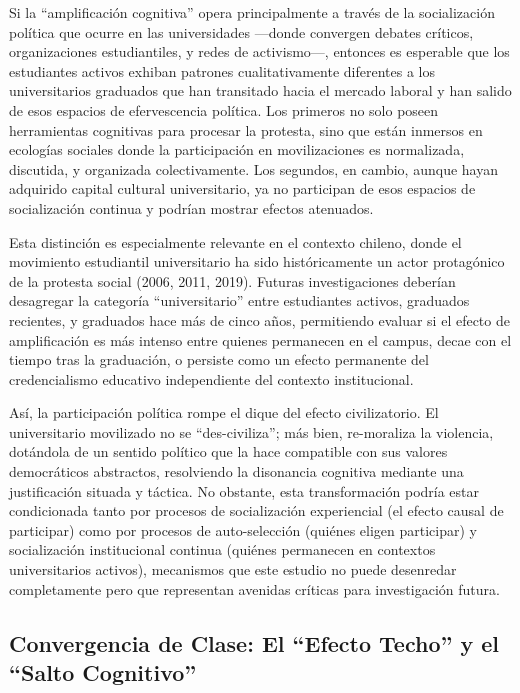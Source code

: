 \documentclass[
  13pt,
]{article}
\begin{document}
Si la ``amplificación cognitiva'' opera principalmente a través de la
socialización política que ocurre en las universidades ---donde
convergen debates críticos, organizaciones estudiantiles, y redes de
activismo---, entonces es esperable que los estudiantes activos exhiban
patrones cualitativamente diferentes a los universitarios graduados que
han transitado hacia el mercado laboral y han salido de esos espacios de
efervescencia política. Los primeros no solo poseen herramientas
cognitivas para procesar la protesta, sino que están inmersos en
ecologías sociales donde la participación en movilizaciones es
normalizada, discutida, y organizada colectivamente. Los segundos, en
cambio, aunque hayan adquirido capital cultural universitario, ya no
participan de esos espacios de socialización continua y podrían mostrar
efectos atenuados.

Esta distinción es especialmente relevante en el contexto chileno, donde
el movimiento estudiantil universitario ha sido históricamente un actor
protagónico de la protesta social (2006, 2011, 2019). Futuras
investigaciones deberían desagregar la categoría ``universitario'' entre
estudiantes activos, graduados recientes, y graduados hace más de cinco
años, permitiendo evaluar si el efecto de amplificación es más intenso
entre quienes permanecen en el campus, decae con el tiempo tras la
graduación, o persiste como un efecto permanente del credencialismo
educativo independiente del contexto institucional.

Así, la participación política rompe el dique del efecto civilizatorio.
El universitario movilizado no se ``des-civiliza''; más bien,
re-moraliza la violencia, dotándola de un sentido político que la hace
compatible con sus valores democráticos abstractos, resolviendo la
disonancia cognitiva mediante una justificación situada y táctica. No
obstante, esta transformación podría estar condicionada tanto por
procesos de socialización experiencial (el efecto causal de participar)
como por procesos de auto-selección (quiénes eligen participar) y
socialización institucional continua (quiénes permanecen en contextos
universitarios activos), mecanismos que este estudio no puede desenredar
completamente pero que representan avenidas críticas para investigación
futura.

\subsection{Convergencia de Clase: El ``Efecto Techo'' y el ``Salto
Cognitivo''}\label{convergencia-de-clase-el-efecto-techo-y-el-salto-cognitivo}
\end{document}
